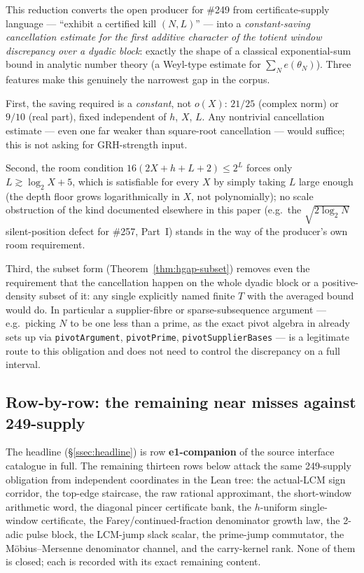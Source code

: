 \begin{rem}
This reduction converts the open producer for \#249 from certificate-supply language --- ``exhibit
a certified kill $(N,L)$'' --- into a \emph{constant-saving cancellation estimate for the first
additive character of the totient window discrepancy over a dyadic block}: exactly the shape of a
classical exponential-sum bound in analytic number theory (a Weyl-type estimate for
$\sum_N e(\theta_N)$). Three features make this genuinely the narrowest gap in the corpus.

First, the saving required is a \emph{constant}, not $o(X)$: $21/25$ (complex norm) or $9/10$
(real part), fixed independent of $h$, $X$, $L$. Any nontrivial cancellation estimate --- even one
far weaker than square-root cancellation --- would suffice; this is not asking for GRH-strength
input.

Second, the room condition $16(2X{+}h{+}L{+}2)\le 2^L$ forces only $L \gtrsim \log_2 X + 5$, which
is satisfiable for every $X$ by simply taking $L$ large enough (the depth floor grows logarithmically
in $X$, not polynomially); no scale obstruction of the kind documented elsewhere in this paper
(e.g.\ the $\sqrt{2\log_2 N}$ silent-position defect for \#257, Part~I) stands in the way of the
producer's own room requirement.

Third, the subset form (Theorem~\ref{thm:hgap-subset}) removes even the requirement that the
cancellation happen on the whole dyadic block or a positive-density subset of it: any single
explicitly named finite $T$ with the averaged bound would do. In particular a supplier-fibre or
sparse-subsequence argument --- e.g.\ picking $N$ to be one less than a prime, as the exact pivot
algebra in  already sets up via
\texttt{pivotArgument}, \texttt{pivotPrime}, \texttt{pivotSupplierBases} --- is a legitimate route
to this obligation and does not need to control the discrepancy on a full interval.
\end{rem}

\subsection{Row-by-row: the remaining near misses against 249-supply}

The headline (\S\ref{ssec:headline}) is row \textbf{e1-companion} of the source interface catalogue
in full. The remaining thirteen rows below attack the same 249-supply obligation from independent
coordinates in the Lean tree: the actual-LCM sign corridor, the top-edge staircase, the raw
rational approximant, the short-window arithmetic word, the diagonal pincer certificate bank, the
$h$-uniform single-window certificate, the Farey/continued-fraction denominator growth law, the
2-adic pulse block, the LCM-jump slack scalar, the prime-jump commutator, the M\"obius--Mersenne
denominator channel, and the carry-kernel rank. None of them is closed; each is recorded with its
exact remaining content.

